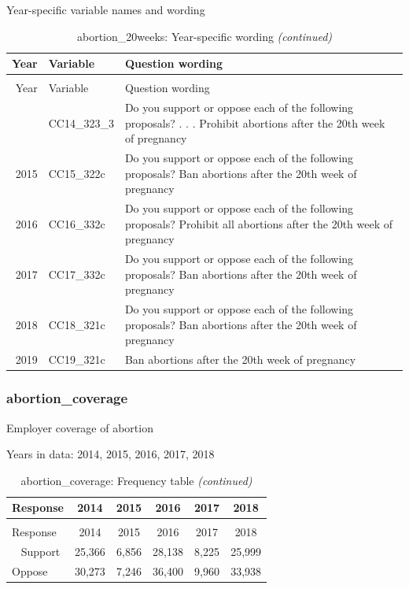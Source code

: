 \documentclass[12pt]{article}
\begin{document}
\endgroup{}

Year-specific variable names and wording

\begin{longtable}[t]{rl>{\raggedright\arraybackslash}p{10cm}}
\caption{\label{tab:unnamed-chunk-4}abortion\_20weeks: Year-specific wording}\\
\toprule
Year & Variable & Question wording\\
\midrule
\endfirsthead
\caption[]{abortion\_20weeks: Year-specific wording \textit{(continued)}}\\
\toprule
Year & Variable & Question wording\\
\midrule
\endhead
\
\endfoot
\bottomrule
\endlastfoot
2014 & CC14\_323\_3 & Do you support or oppose each of the following proposals? . . . Prohibit abortions after the 20th week of pregnancy\\
2015 & CC15\_322c & Do you support or oppose each of the following proposals? Ban abortions after the 20th week of pregnancy\\
2016 & CC16\_332c & Do you support or oppose each of the following proposals? Prohibit all abortions after the 20th week of pregnancy\\
2017 & CC17\_332c & Do you support or oppose each of the following proposals? Ban abortions after the 20th week of pregnancy\\
2018 & CC18\_321c & Do you support or oppose each of the following proposals? Ban abortions after the 20th week of pregnancy\\
2019 & CC19\_321c & Ban abortions after the 20th week of pregnancy\\*
\end{longtable}

\subsubsection{abortion\_coverage}\label{abortion_coverage}

Employer coverage of abortion

Years in data: 2014, 2015, 2016, 2017,
2018\begingroup\fontsize{10}{12}\selectfont

\begin{longtable}[t]{lccccc}
\caption{\label{tab:unnamed-chunk-4}abortion\_coverage: Frequency table}\\
\toprule
Response & 2014 & 2015 & 2016 & 2017 & 2018\\
\midrule
\endfirsthead
\caption[]{abortion\_coverage: Frequency table \textit{(continued)}}\\
\toprule
Response & 2014 & 2015 & 2016 & 2017 & 2018\\
\midrule
\endhead
\
\endfoot
\bottomrule
\endlastfoot
Support & 25,366 & 6,856 & 28,138 & 8,225 & 25,999\\
Oppose & 30,273 & 7,246 & 36,400 & 9,960 & 33,938\\*
\end{longtable}
\end{document}
